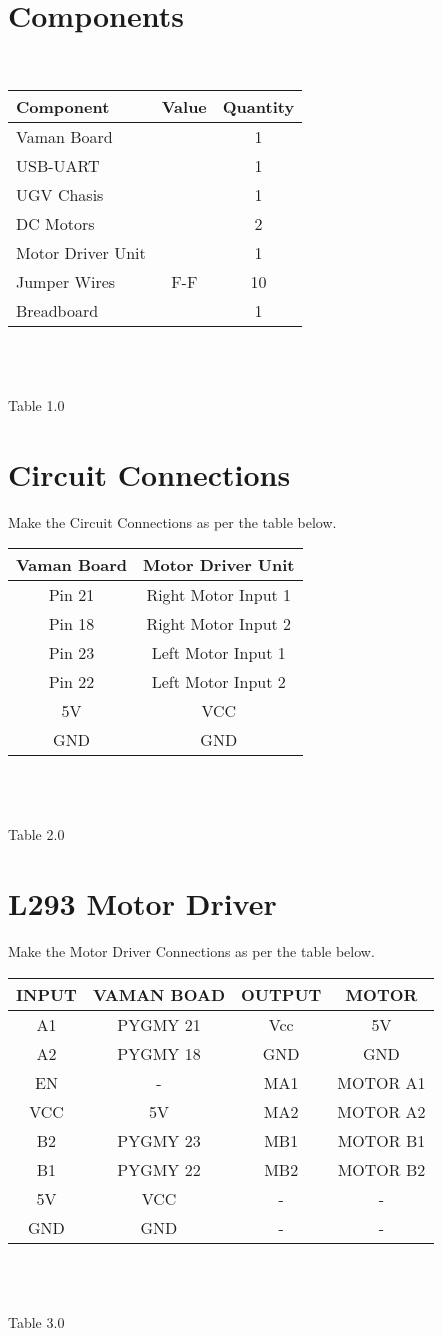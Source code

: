 \documentclass[journal,15pt,twocolumn,tikz, border=5mm]{IEEEtran}
\begin{document}
\section{Components}
\
\centering
\begin{tabular}{|l|c|c|}
\hline
Component & Value & Quantity\\
\hline
Vaman Board & & 1\\
\hline
USB-UART & & 1\\
\hline
UGV Chasis & & 1\\
\hline
DC Motors & & 2\\
\hline
Motor Driver Unit &  & 1\\
\hline
Jumper Wires & F-F & 10\\
\hline
Breadboard & & 1\\
\hline
\end{tabular}\\
\
\centerline{Table 1.0}

\section{Circuit Connections}
\raggedright
Make the Circuit Connections as per the table below.\\
\vspace{0.25cm}
\centering
\begin{tabular}{|c|c|}
\hline
Vaman Board & Motor Driver Unit\\
\hline
Pin 21 & Right Motor Input 1\\
\hline
Pin 18 & Right Motor Input 2\\
\hline
Pin 23 & Left Motor Input 1\\
\hline
Pin 22 & Left Motor Input 2\\
\hline
5V & VCC\\
\hline
GND & GND\\
\hline
\end{tabular}\\
\
\centerline{Table 2.0}
\section{L293 Motor Driver}
\raggedright
Make the Motor Driver Connections as per the table below.\\
\vspace{0.25cm}
\centering
\begin{tabular}{|c|c|c|c|}
\hline
INPUT & VAMAN BOAD &OUTPUT & MOTOR \\
\hline
A1 & PYGMY 21 & Vcc & 5V\\
\hline
A2 & PYGMY 18 & GND &GND  \\
\hline
EN & - & MA1 & MOTOR A1\\
\hline
VCC & 5V & MA2 & MOTOR A2\\
\hline
B2 & PYGMY 23 & MB1 & MOTOR B1\\
\hline
B1 & PYGMY 22 & MB2 & MOTOR B2\\
\hline
5V & VCC&-&-\\
\hline
GND & GND&-&-\\
\hline
\end{tabular}\\
\
\centerline{Table 3.0}
\end{document}
